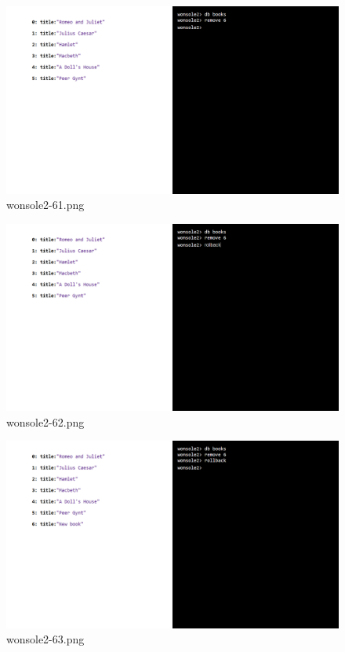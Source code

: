 \clearpage
\begin{figure}
\includegraphics[width=\textwidth]{screenshot/wonsole2/wonsole2-61.png}
\caption{wonsole2-61.png}
\label{wonsole2-61.png}
\end{figure}


\begin{figure}
\includegraphics[width=\textwidth]{screenshot/wonsole2/wonsole2-62.png}
\caption{wonsole2-62.png}
\label{wonsole2-62.png}
\end{figure}


\clearpage
\begin{figure}
\includegraphics[width=\textwidth]{screenshot/wonsole2/wonsole2-63.png}
\caption{wonsole2-63.png}
\label{wonsole2-63.png}
\end{figure}


